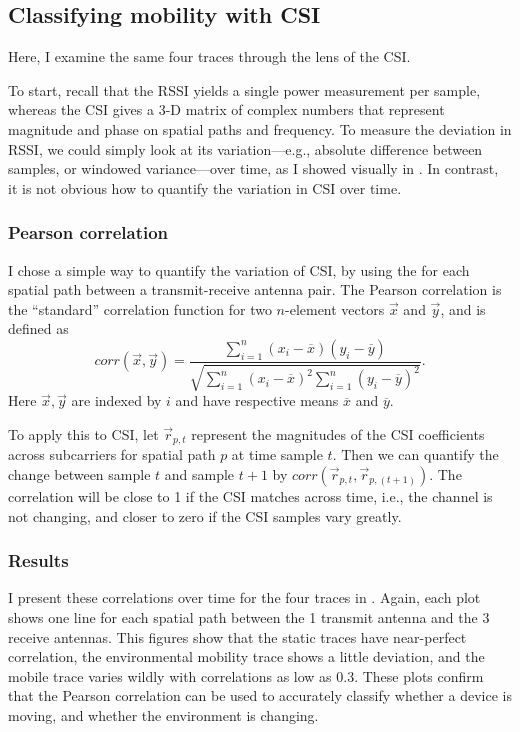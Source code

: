 \subsection{Classifying mobility with CSI} Here, I examine the same four traces through the lens of the CSI.

To start, recall that the RSSI yields a single power measurement per sample, whereas the CSI gives a 3-D matrix of complex numbers that represent magnitude and phase on spatial paths and frequency. To measure the deviation in RSSI, we could simply look at its variation---e.g., absolute difference between samples, or windowed variance---over time, as I showed visually in . In contrast, it is not obvious how to quantify the variation in CSI over time.

\subsubsection{Pearson correlation}
I chose a simple way to quantify the variation of CSI, by using the  for each spatial path between a transmit-receive antenna pair. The Pearson correlation is the ``standard'' correlation function for two $n$-element vectors $\vec{x}$ and $\vec{y}$, and is defined as
\begin{equation}
\textit{corr}(\vec{x},\vec{y}) = \frac{\sum_{i=1}^n(x_i-\overline{x})(y_i-\overline{y})}{\sqrt{\sum_{i=1}^n(x_i-\overline{x})^2 \sum_{i=1}^n(y_i-\overline{y})^2}}.
\end{equation}
Here $\vec{x},\vec{y}$ are indexed by $i$ and have respective means $\overline{x}$ and $\overline{y}$.

To apply this to CSI, let $\vec{r}_{p,t}$ represent the magnitudes of the CSI coefficients across subcarriers for spatial path $p$ at time sample $t$. Then we can quantify the change between sample $t$ and sample $t+1$ by $\textit{corr}(\vec{r}_{p,t},\vec{r}_{p,(t+1)})$. The correlation will be close to 1 if the CSI matches across time, i.e., the channel is not changing, and closer to zero if the CSI samples vary greatly.

\subsubsection{Results}
I present these correlations over time for the four traces in . Again, each plot shows one line for each spatial path between the 1 transmit antenna and the 3 receive antennas. This figures show that the static traces have near-perfect correlation, the environmental mobility trace shows a little deviation, and the mobile trace varies wildly with correlations as low as 0.3. These plots confirm that the Pearson correlation can be used to accurately classify whether a device is moving, and whether the environment is changing.

